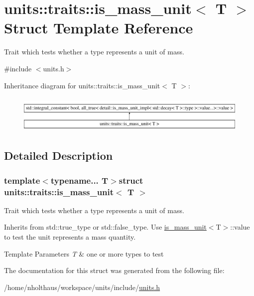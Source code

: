 \hypertarget{structunits_1_1traits_1_1is__mass__unit}{}\section{units\+:\+:traits\+:\+:is\+\_\+mass\+\_\+unit$<$ T $>$ Struct Template Reference}
\label{structunits_1_1traits_1_1is__mass__unit}


Trait which tests whether a type represents a unit of mass.  




{\ttfamily \#include $<$units.\+h$>$}

Inheritance diagram for units\+:\+:traits\+:\+:is\+\_\+mass\+\_\+unit$<$ T $>$\+:\begin{figure}[H]
\begin{center}
\leavevmode
\includegraphics[height=1.806452cm]{structunits_1_1traits_1_1is__mass__unit}
\end{center}
\end{figure}


\subsection{Detailed Description}
\subsubsection*{template$<$typename... T$>$struct units\+::traits\+::is\+\_\+mass\+\_\+unit$<$ T $>$}

Trait which tests whether a type represents a unit of mass. 

Inherits from {\ttfamily std\+::true\+\_\+type} or {\ttfamily std\+::false\+\_\+type}. Use {\ttfamily \hyperlink{structunits_1_1traits_1_1is__mass__unit}{is\+\_\+mass\+\_\+unit}$<$T$>$\+::value} to test the unit represents a mass quantity. 
\begin{DoxyTemplParams}{Template Parameters}
{\em T} & one or more types to test \\
\hline
\end{DoxyTemplParams}


The documentation for this struct was generated from the following file\+:\begin{DoxyCompactItemize}
\item 
/home/nholthaus/workspace/units/include/\hyperlink{units_8h}{units.\+h}\end{DoxyCompactItemize}
